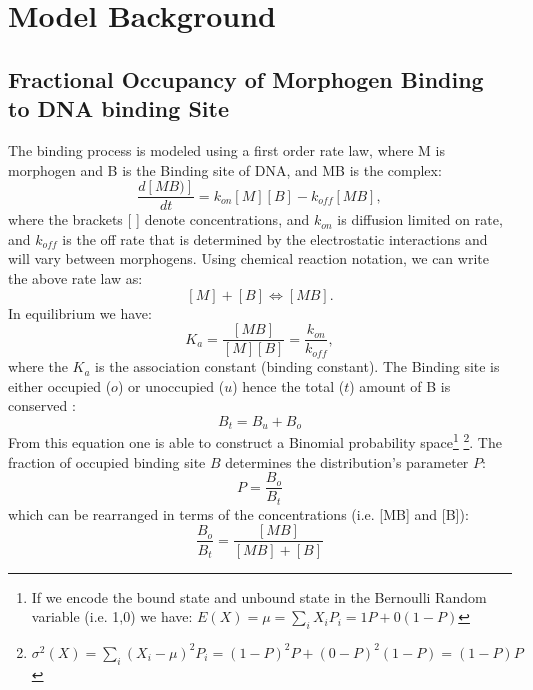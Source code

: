 
 \section{ Model Background}

 \subsection{ Fractional Occupancy of Morphogen Binding to DNA binding Site}

The binding process is modeled using a first order rate law, where M is morphogen and B is the Binding site of DNA, and MB is the complex:
\begin{equation}\label{}
    \frac{d [MB)]}{dt}= k_{on}[M][B] - k_{off}[MB],
\end{equation}
where the brackets [ ] denote concentrations, and $k_{on}$ is diffusion limited on rate,  and $k_{off}$ is the off rate that is determined by the electrostatic interactions and will vary between morphogens.  Using chemical reaction notation, we can write the above rate law as:
\begin{equation}\label{}
    [M] + [B] \Leftrightarrow [MB].
\end{equation}
In equilibrium we have:
\begin{equation}\label{ka}
  K_{a} =  \frac{[MB]}{[M][B]}= \frac{k_{on} }{k_{off}},
\end{equation}
where the $K_{a}$ is the association constant (binding constant).
The Binding site is either occupied ($o$) or unoccupied ($u$) hence the total ($t$) amount of B is conserved :
\begin{equation}\label{}
    B_{t} = B_{u} + B_{o}
\end{equation}
From this equation one is able to construct a Binomial probability space\footnote[2]{If we encode the bound state and unbound state in the Bernoulli Random variable (i.e. 1,0) we have: $E(X) = \mu = \sum_i X_i P_i = 1 P + 0 (1-P) $} \footnote[3]{ $\sigma^2 (X) =\sum_i (X_i-\mu)^2 P_i = (1-P)^2P + (0-P)^2(1-P) = (1-P)P $ }.  The fraction of occupied binding site $B$ determines the distribution's parameter $P$:
\begin{equation}\label{}
   P = \frac{B_{o}}{B_{t}}
\end{equation}
which can be rearranged in terms of the concentrations (i.e. [MB] and [B]):
\begin{equation}\label{Zb}
    \frac{B_{o}}{B_{t}} =\frac{[MB]}{[MB] + [B]}
\end{equation}

